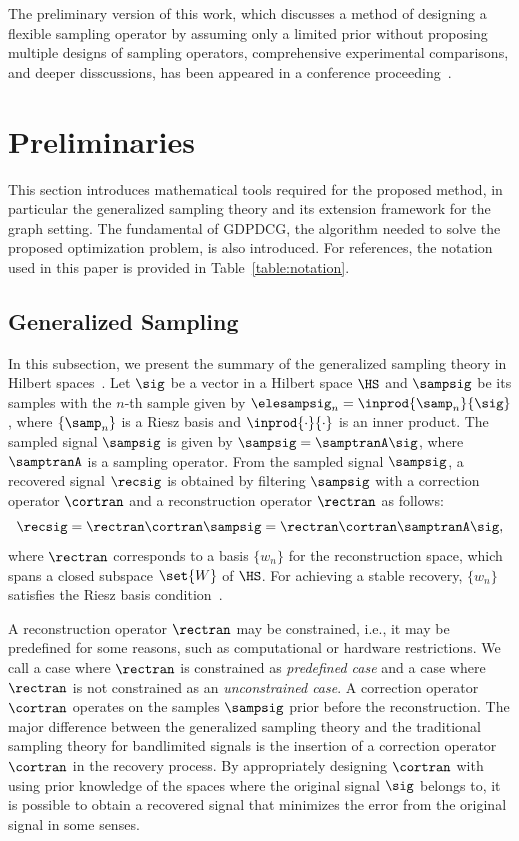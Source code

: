 \documentclass[journal]{IEEEtran}
\begin{document}
The preliminary version of this work, which discusses a method of designing a flexible sampling operator by assuming only a limited prior without proposing multiple designs of sampling operators, comprehensive experimental comparisons, and deeper disscussions, has been appeared in a conference proceeding~\cite{yamashita2024apsipa}.

\section{Preliminaries}
\label{sec:preliminaries}

This section introduces mathematical tools required for the proposed method, in particular the generalized sampling theory and its extension framework for the graph setting.
The fundamental of GDPDCG, the algorithm needed to solve the proposed optimization problem, is also introduced. 
For references, the notation used in this paper is provided in Table~\ref{table:notation}.

\subsection{Generalized Sampling} \label{sec:gs}
In this subsection, we present the summary of the generalized sampling theory in Hilbert spaces~\cite{eldar2003sampling, eldar2015sampling}.
Let $\sig$ be a vector in a Hilbert space $\HS$ and $\sampsig$ be its samples with the $n$-th sample given by $\elesampsig_n = \inprod{\samp_n}{\sig}$, where $\{ \samp_n \}$ is a Riesz basis and $\inprod{\cdot}{\cdot}$ is an inner product.
The sampled signal $\sampsig$ is given by $\sampsig = \samptranA \sig$, where $\samptranA$ is a sampling operator.
From the sampled signal $\sampsig$, a recovered signal $\recsig$ is obtained by filtering $\sampsig$ with a correction operator $\cortran$ and a reconstruction operator $\rectran$ as follows:
\begin{equation} \label{recsig}
    \recsig = \rectran \cortran \sampsig = \rectran \cortran \samptranA \sig,
\end{equation}
where $\rectran$ corresponds to a basis $\{ w_n \}$ for the reconstruction space, which spans a closed subspace $\set{W}$ of $\HS$.
For achieving a stable recovery, $\{ w_n \}$ satisfies the Riesz basis condition~\cite{eldar2015sampling}.

A reconstruction operator $\rectran$ may be constrained, i.e., it may be predefined for some reasons, such as computational or hardware restrictions.
We call a case where $\rectran$ is constrained as \textit{predefined case} and a case where $\rectran$ is not constrained as an \textit{unconstrained case}.
A correction operator $\cortran$ operates on the samples $\sampsig$ prior before the reconstruction.
The major difference between the generalized sampling theory and the traditional sampling theory for bandlimited signals is the insertion of a correction operator $\cortran$ in the recovery process.
By appropriately designing $\cortran$ with using prior knowledge of the spaces where the original signal $\sig$ belongs to, it is possible to obtain a recovered signal that minimizes the error from the original signal in some senses.
\end{document}
